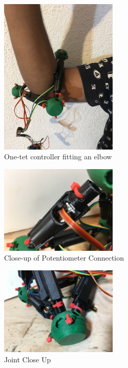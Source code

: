 \documentclass[11pt]{article}
\begin{document}
\begin{figure}[H]
  \centering
    \includegraphics[angle=270,width=0.5\textwidth]{figures/ElbowFitting.JPG}
    \caption[One-tet controller fitting an elbow]{One-tet controller fitting an elbow}
      \label{fig:elbowfitting}
\end{figure}

\begin{figure}[H]
  \centering
    \includegraphics[width=0.5\textwidth]{figures/PotConnectionCloseUp.JPG}
    \caption[Close-up of Potentiometer Connection]{Close-up of Potentiometer Connection}
      \label{fig:potcloseup}
\end{figure}

\begin{figure}[H]
  \centering
    \includegraphics[width=0.5\textwidth]{figures/JointCloseUp.JPG}
    \caption[Joint Close Up]{Joint Close Up}
      \label{fig:jointcloseup}
\end{figure}
\end{document}
